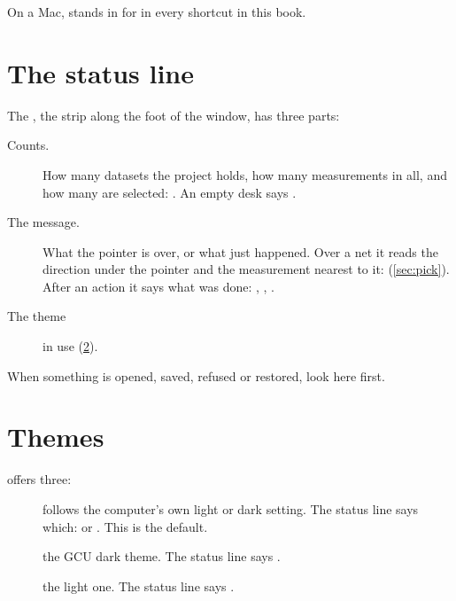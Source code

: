 
On a Mac,  stands in for  in every shortcut in this book.

\section{The status line}\label{sec:status}


The , the strip along the foot of the window, has three parts:

\begin{description}
\item[Counts.] How many datasets the project holds, how many measurements in all, and how many are
selected: . An empty desk says
.
\item[The message.] What the pointer is over, or what just happened. Over a net it reads the direction
under the pointer and the measurement nearest to it:  (\cref{sec:pick}). After an action it says what was done: ,
, .
\item[The theme] in use (\cref{sec:themes}).
\end{description}

When something is opened, saved, refused or restored, look here first.

\section{Themes}\label{sec:themes}


 offers three:

\begin{description}
\item[] follows the computer's own light or dark setting. The status line says which:
 or . This is the default.
\item[] the GCU dark theme. The status line says .
\item[] the light one. The status line says .
\end{description}

